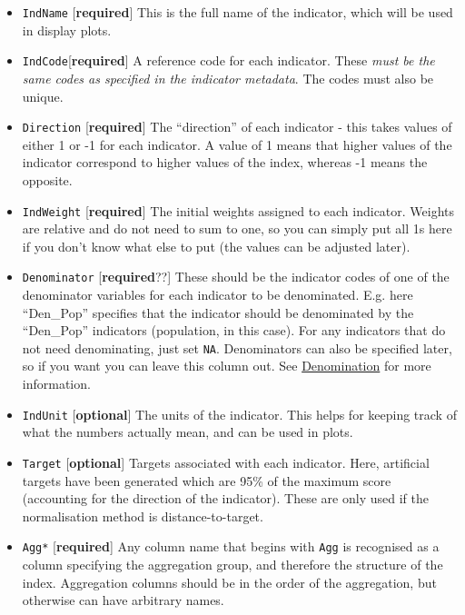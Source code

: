 \documentclass[
]{book}
\providecommand{\tightlist}{%
  \setlength{\itemsep}{0pt}\setlength{\parskip}{0pt}}
\begin{document}
\begin{itemize}
\tightlist
\item
  \texttt{IndName} {[}\textbf{required}{]} This is the full name of the indicator, which will be used in display plots.
\item
  \texttt{IndCode}{[}\textbf{required}{]} A reference code for each indicator. These \emph{must be the same codes as specified in the indicator metadata}. The codes must also be unique.
\item
  \texttt{Direction} {[}\textbf{required}{]} The ``direction'' of each indicator - this takes values of either 1 or -1 for each indicator. A value of 1 means that higher values of the indicator correspond to higher values of the index, whereas -1 means the opposite.
\item
  \texttt{IndWeight} {[}\textbf{required}{]} The initial weights assigned to each indicator. Weights are relative and do not need to sum to one, so you can simply put all 1s here if you don't know what else to put (the values can be adjusted later).
\item
  \texttt{Denominator} {[}\textbf{required}??{]} These should be the indicator codes of one of the denominator variables for each indicator to be denominated. E.g. here ``Den\_Pop'' specifies that the indicator should be denominated by the ``Den\_Pop'' indicators (population, in this case). For any indicators that do not need denominating, just set \texttt{NA}. Denominators can also be specified later, so if you want you can leave this column out. See \protect\hyperlink{denomination}{Denomination} for more information.
\item
  \texttt{IndUnit} {[}\textbf{optional}{]} The units of the indicator. This helps for keeping track of what the numbers actually mean, and can be used in plots.
\item
  \texttt{Target} {[}\textbf{optional}{]} Targets associated with each indicator. Here, artificial targets have been generated which are 95\% of the maximum score (accounting for the direction of the indicator). These are only used if the normalisation method is distance-to-target.
\item
  \texttt{Agg*} {[}\textbf{required}{]} Any column name that begins with \texttt{Agg} is recognised as a column specifying the aggregation group, and therefore the structure of the index. Aggregation columns should be in the order of the aggregation, but otherwise can have arbitrary names.
\end{itemize}
\end{document}
